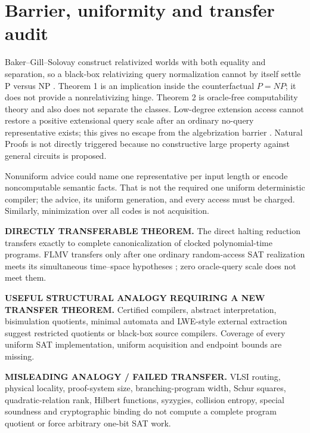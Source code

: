\documentclass[11pt]{article}
\begin{document}
\section{Barrier, uniformity and transfer audit}

Baker--Gill--Solovay construct relativized worlds with both equality and
separation, so a black-box relativizing query normalization cannot by itself
settle P versus NP \cite{bgs}.  Theorem 1 is an implication inside the
counterfactual $P=NP$; it does not provide a nonrelativizing hinge.  Theorem 2
is oracle-free computability theory and also does not separate the classes.
Low-degree extension access cannot restore a positive extensional query
scale after an ordinary no-query representative exists; this gives no escape
from the algebrization barrier \cite{aw}.  Natural Proofs is not directly
triggered because no constructive large property against general circuits is
proposed.

Nonuniform advice could name one representative per input length or encode
noncomputable semantic facts.  That is not the required one uniform
deterministic compiler; the advice, its uniform generation, and every access
must be charged.  Similarly, minimization over all codes is not acquisition.

\begin{description}[leftmargin=0cm,labelwidth=0cm]
\item[] \textbf{DIRECTLY TRANSFERABLE THEOREM.}
The direct halting reduction transfers exactly to complete canonicalization
of clocked polynomial-time programs.  FLMV transfers only after one ordinary
random-access SAT realization meets its simultaneous time--space hypotheses
\cite{flmv}; zero oracle-query scale does not meet them.
\item[] \textbf{USEFUL STRUCTURAL ANALOGY REQUIRING A NEW TRANSFER THEOREM.}
Certified compilers, abstract interpretation, bisimulation quotients, minimal
automata and LWE-style external extraction suggest restricted quotients or
black-box source compilers.  Coverage of every uniform SAT implementation,
uniform acquisition and endpoint bounds are missing.
\item[] \textbf{MISLEADING ANALOGY / FAILED TRANSFER.}
VLSI routing, physical locality, proof-system size, branching-program width,
Schur squares, quadratic-relation rank, Hilbert functions, syzygies, collision
entropy, special soundness and cryptographic binding do not compute a complete
program quotient or force arbitrary one-bit SAT work.
\end{description}
\end{document}
